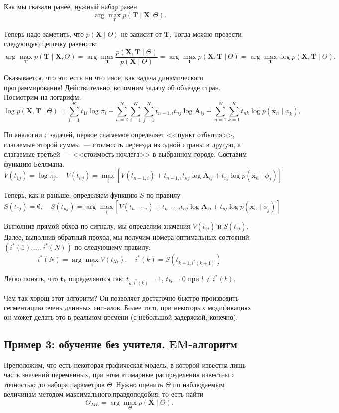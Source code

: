 Как мы сказали ранее, нужный набор равен
\[
	\arg\max_{\mathbf{T}}p(\mathbf{T} \mid \mathbf{X}, \Theta).
\]

Теперь надо заметить, что \(p(\mathbf{X} \mid \Theta)\) не зависит от 
\(\mathbf{T}\). Тогда можно провести следующую цепочку равенств:
\[
	\arg\max_{\mathbf{T}}p(\mathbf{T} \mid \mathbf{X}, \Theta) = 
	\arg\max_{\mathbf{T}}\frac{p(\mathbf{X}, \mathbf{T} \mid 
	\Theta)}{p(\mathbf{X} \mid \Theta)} = \arg\max_{\mathbf{T}}p(\mathbf{X}, 
	\mathbf{T} \mid \Theta) = \arg\max_{\mathbf{T}}\log p(\mathbf{X}, 
	\mathbf{T} \mid \Theta).
\]

Оказывается, что это есть ни что иное, как задача динамического 
программирования! Действительно, вспомним задачу об объезде стран. Посмотрим на 
логарифм:
\[
	\log p(\mathbf{X}, \mathbf{T} \mid \Theta) = \sum_{i = 1}^{K}t_{1i}\log 
	\pi_{i} + \sum_{n = 2}^{N}\sum_{i = 1}^{K}\sum_{j = 1}^{K}t_{n - 1, 
	i}t_{nj}\log \mathbf{A}_{ij} + \sum_{n = 1}^{N}\sum_{k = 1}^{K} t_{nk}\log 
	p(\mathbf{x}_{n} \mid \phi_{k}).
\]

По аналогии с задачей, первое слагаемое определяет <<пункт отбытия>>, 
слагаемые второй суммы~--- стоимость переезда из одной страны в другую, а 
слагаемые третьей~--- <<стоимость ночлега>> в выбранном городе. Составим 
функцию Беллмана:
\[
	V(t_{1j}) = \log\pi_{j}, \quad V(t_{nj}) = \max_{i}\left[V(t_{n - 1, i}) + 
	t_{n - 1, i}t_{nj}\log \mathbf{A}_{ij} + t_{nj}\log p(\mathbf{x}_{n} \mid 
	\phi_{j})\right]
\]

Теперь, как и раньше, определяем функцию \(S\) по правилу
\[
	S(t_{1j}) = \emptyset, \quad S(t_{nj}) = \arg\max_{i}\left[V(t_{n - 1, i}) 
	+ t_{n - 1, i}t_{nj}\log \mathbf{A}_{ij} + t_{nj}\log p(\mathbf{x}_{n} \mid 
	\phi_{j})\right]
\]

Выполнив прямой обход по сигналу, мы определим значения \(V(t_{ij})\) и 
\(S(t_{ij})\). Далее, выполнив обратный проход, мы получим номера оптимальных 
состояний \((i^{*}(1), \ldots, i^{*}(N))\) по следующему правилу:
\[
	i^{*}(N) = \arg\max_{i}V(t_{Ni}), \quad i^{*}(k) = S(t_{k + 1,i^{*}(k + 1)})
\]

Легко понять, что \(\mathbf{t}_{k}\) определяются так: \(t_{k, i^{*}(k)} = 1\), 
\(t_{kl} = 0\) при \(l \neq i^{*}(k)\).

Чем так хорош этот алгоритм? Он позволяет достаточно быстро производить 
сегментацию очень длинных сигналов. Более того, при некоторых модификациях он 
может делать это в реальном времени (с небольшой задержкой, конечно).

\subsection{Пример 3: обучение без учителя. EM-алгоритм}
Преположим, что есть некоторая графическая модель, в которой известна лишь 
часть значений переменных, при этом атомарные распределения известны с 
точностью до набора параметров \(\Theta\). Нужно оценить \(\Theta\) по 
наблюдаемым величинам методом максимального правдоподобия, то есть найти
\[
	\Theta_{ML} = \arg\max_{\Theta} p(\mathbf{X} \mid \Theta).
\]

